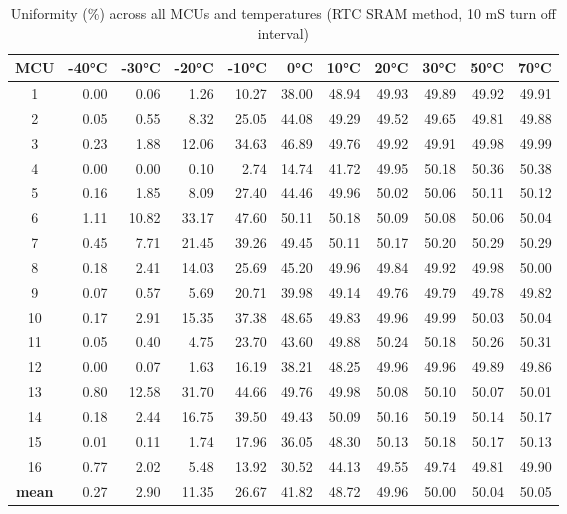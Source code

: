 \begin{table}[ht!]
    \centering
    \begin{tabular}{c||rrrrrrrrrr}
\toprule
\textbf{MCU} & \textbf{-40°C} & \textbf{-30°C} & \textbf{-20°C} & \textbf{-10°C} & \textbf{0°C} & \textbf{10°C} & \textbf{20°C} & \textbf{30°C} & \textbf{50°C} & \textbf{70°C} \\
\midrule
1    &   0.00 &   0.06 &   1.26 &  10.27 & 38.00 & 48.94 & 49.93 & 49.89 & 49.92 & 49.91 \\
2    &   0.05 &   0.55 &   8.32 &  25.05 & 44.08 & 49.29 & 49.52 & 49.65 & 49.81 & 49.88 \\
3    &   0.23 &   1.88 &  12.06 &  34.63 & 46.89 & 49.76 & 49.92 & 49.91 & 49.98 & 49.99 \\
4    &   0.00 &   0.00 &   0.10 &   2.74 & 14.74 & 41.72 & 49.95 & 50.18 & 50.36 & 50.38 \\
5    &   0.16 &   1.85 &   8.09 &  27.40 & 44.46 & 49.96 & 50.02 & 50.06 & 50.11 & 50.12 \\
6    &   1.11 &  10.82 &  33.17 &  47.60 & 50.11 & 50.18 & 50.09 & 50.08 & 50.06 & 50.04 \\
7    &   0.45 &   7.71 &  21.45 &  39.26 & 49.45 & 50.11 & 50.17 & 50.20 & 50.29 & 50.29 \\
8    &   0.18 &   2.41 &  14.03 &  25.69 & 45.20 & 49.96 & 49.84 & 49.92 & 49.98 & 50.00 \\
9    &   0.07 &   0.57 &   5.69 &  20.71 & 39.98 & 49.14 & 49.76 & 49.79 & 49.78 & 49.82 \\
10   &   0.17 &   2.91 &  15.35 &  37.38 & 48.65 & 49.83 & 49.96 & 49.99 & 50.03 & 50.04 \\
11   &   0.05 &   0.40 &   4.75 &  23.70 & 43.60 & 49.88 & 50.24 & 50.18 & 50.26 & 50.31 \\
12   &   0.00 &   0.07 &   1.63 &  16.19 & 38.21 & 48.25 & 49.96 & 49.96 & 49.89 & 49.86 \\
13   &   0.80 &  12.58 &  31.70 &  44.66 & 49.76 & 49.98 & 50.08 & 50.10 & 50.07 & 50.01 \\
14   &   0.18 &   2.44 &  16.75 &  39.50 & 49.43 & 50.09 & 50.16 & 50.19 & 50.14 & 50.17 \\
15   &   0.01 &   0.11 &   1.74 &  17.96 & 36.05 & 48.30 & 50.13 & 50.18 & 50.17 & 50.13 \\
16   &   0.77 &   2.02 &   5.48 &  13.92 & 30.52 & 44.13 & 49.55 & 49.74 & 49.81 & 49.90 \\
\textbf{mean} &   0.27 &   2.90 &  11.35 &  26.67 & 41.82 & 48.72 & 49.96 & 50.00 & 50.04 & 50.05 \\
\bottomrule
\end{tabular}
    \captionsetup{justification=centering,margin=0.5cm}
    \caption{Uniformity (\%) across all MCUs and temperatures (RTC SRAM method, 10 mS turn off interval)}
    \label{table:uniformity_rtc_sram}
\end{table}

